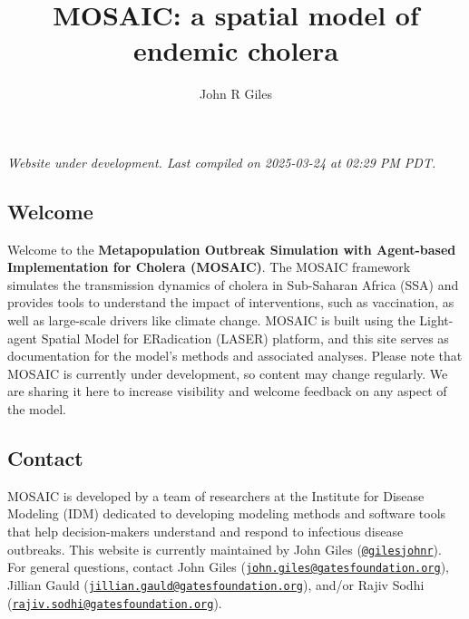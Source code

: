 \documentclass[
]{book}
\title{MOSAIC: a spatial model of endemic cholera}
\author{John R Giles}
\date{}
\begin{document}
\maketitle

{
\setcounter{tocdepth}{1}
\tableofcontents
}
\chapter*{}\label{section}

\hfill\break

{\emph{
Website under development. Last compiled on 2025-03-24 at 02:29 PM PDT.
}}

\section*{Welcome}\label{welcome}

Welcome to the \textbf{Metapopulation Outbreak Simulation with Agent-based Implementation for Cholera (MOSAIC)}. The MOSAIC framework simulates the transmission dynamics of cholera in Sub-Saharan Africa (SSA) and provides tools to understand the impact of interventions, such as vaccination, as well as large-scale drivers like climate change. MOSAIC is built using the Light-agent Spatial Model for ERadication (LASER) platform, and this site serves as documentation for the model's methods and associated analyses. Please note that MOSAIC is currently under development, so content may change regularly. We are sharing it here to increase visibility and welcome feedback on any aspect of the model.

\section*{Contact}\label{contact}

MOSAIC is developed by a team of researchers at the Institute for Disease Modeling (IDM) dedicated to developing modeling methods and software tools that help decision-makers understand and respond to infectious disease outbreaks. This website is currently maintained by John Giles (\href{https://github.com/gilesjohnr}{\texttt{@gilesjohnr}}). For general questions, contact John Giles (\href{mailto:john.giles@gatesfoundation.org}{\nolinkurl{john.giles@gatesfoundation.org}}), Jillian Gauld (\href{mailto:jillian.gauld@gatesfoundation.org}{\nolinkurl{jillian.gauld@gatesfoundation.org}}), and/or Rajiv Sodhi (\href{mailto:rajiv.sodhi@gatesfoundation.org}{\nolinkurl{rajiv.sodhi@gatesfoundation.org}}).
\end{document}
